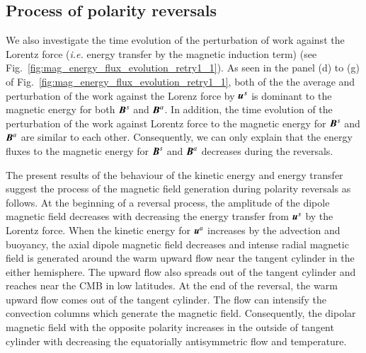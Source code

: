 {\color{red}
\subsection{Process of polarity reversals}
We also investigate the time evolution of the perturbation of work against the Lorentz force ({\it i.e.} energy transfer by the magnetic induction term) (see Fig.~\ref{fig:mag_energy_flux_evolution_retry1_1}).
{\color{teal}
As seen in the panel (d) to (g) of Fig.~\ref{fig:mag_energy_flux_evolution_retry1_1}, both of the the average and perturbation of the work against the Lorenz force by $\mbox{\boldmath$u$}^s$ is dominant to the magnetic energy for both $\mbox{\boldmath$B$}^s$ and $\mbox{\boldmath$B$}^a$.
}
{\color{teal}
In addition, the time evolution of the perturbation of the work against Lorentz force to the magnetic energy for $\mbox{\boldmath$B$}^s$ and $\mbox{\boldmath$B$}^a$ are similar to each other.
}
{\color{teal}
Consequently, we can only explain that the energy fluxes to the magnetic energy for $\mbox{\boldmath$B$}^s$ and $\mbox{\boldmath$B$}^a$ decreases during the reversals.
}



The present results of the behaviour of the kinetic energy and energy transfer suggest the process of the magnetic field generation during polarity reversals as follows.
At the beginning of a reversal process, the amplitude of the dipole magnetic field decreases with decreasing the energy transfer from $\mbox{\boldmath$u$}^s$ by the Lorentz force. 
When the kinetic energy for $\mbox{\boldmath$u$}^a$ increases by the advection and buoyancy, the axial dipole magnetic field decreases and intense radial magnetic field is generated around the warm upward flow near the tangent cylinder in the either hemisphere. 
The upward flow also spreads out of the tangent cylinder and reaches near the CMB in low latitudes. 
At the end of the reversal, the warm upward flow comes out of the tangent cylinder. 
The flow can intensify the convection columns which generate the magnetic field. 
Consequently, the dipolar magnetic field with the opposite polarity increases in the outside of tangent cylinder with decreasing the equatorially antisymmetric flow and temperature.

}
